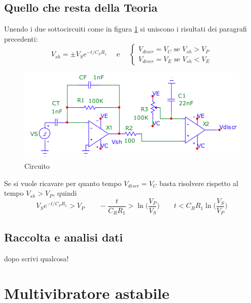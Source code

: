 \documentclass{article}
\begin{document}
		\subsection{Quello che resta della Teoria}
			Unendo i due sottocircuiti come in figura \ref{fig:circ} si uniscono i risultati dei paragrafi precedenti:
			\begin{equation}
				V_{sh}=\pm V_Se^{-t/C_FR_1}\quad \textrm{ e }\quad 
				\begin{cases}
					V_{discr}=V_C \textrm{ se } V_{sh}>V_P\\
					V_{discr}=V_E \textrm{ se } V_{sh}<V_E
				\end{cases}
			\end{equation}
			\begin{figure}
				\label{fig:circ}
				\centering
				\includegraphics[width=120mm]{immagini/circa.png}
				\caption{Circuito}
			\end{figure}
			Se si vuole ricavare per quanto tempo $V_{discr}=V_C$ basta risolvere rispetto al tempo $V_{sh}>V_P$, quindi
			\begin{equation}
				V_Se^{-t/C_FR_1}>V_P\qquad-\frac{t}{C_RR_1}>\ln \bigg(\frac{V_P}{V_S}\bigg)\qquad t<C_RR_1\ln \bigg(\frac{V_S}{V_P}\bigg)
			\end{equation}
		\subsection{Raccolta e analisi dati}
			dopo scrivi qualcosa!
	\section{Multivibratore astabile}
\end{document}
